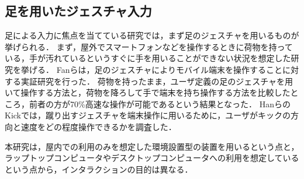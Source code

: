 \documentclass[submit, techrep]{ipsj}
\begin{document}
\subsection{足を用いたジェスチャ入力}
足による入力に焦点を当てている研究では，まず足のジェスチャを用いるものが挙げられる．
まず，屋外でスマートフォンなどを操作するときに荷物を持っている，手が汚れているというすぐに手を用いることができない状況を想定した研究を挙げる．
Fanら\cite{Fan:2017:ESF:3123021.3123043}は，足のジェスチャによりモバイル端末を操作することに対する実証研究を行った．
荷物を持ったまま，ユーザ定義の足のジェスチャを用いて操作する方法と，荷物を降ろして手で端末を持ち操作する方法を比較したところ，前者の方が70\%高速な操作が可能であるという結果となった．
HanらのKick\cite{Han:2011:KIU:2037373.2037379}では，蹴り出すジェスチャを端末操作に用いるために，ユーザがキックの方向と速度をどの程度操作できるかを調査した．\par
本研究は，屋内での利用のみを想定した環境設置型の装置を用いるという点と，ラップトップコンピュータやデスクトップコンピュータへの利用を想定しているという点から，インタラクションの目的は異なる．\par
\end{document}
